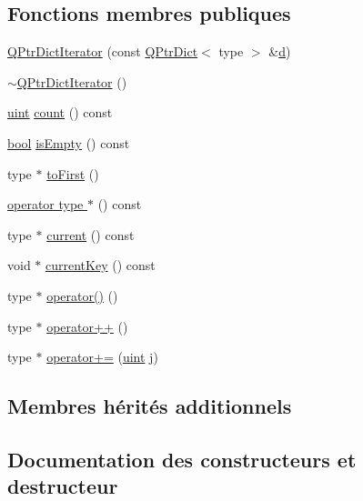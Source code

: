 \subsection*{Fonctions membres publiques}
\begin{DoxyCompactItemize}
\item 
\hyperlink{class_q_ptr_dict_iterator_a6ad02cc60356c93aaff407ed183ffecd}{Q\+Ptr\+Dict\+Iterator} (const \hyperlink{class_q_ptr_dict}{Q\+Ptr\+Dict}$<$ type $>$ \&\hyperlink{060__command__switch_8tcl_af43f4b1f0064a33b2d662af9f06d3a00}{d})
\item 
\hyperlink{class_q_ptr_dict_iterator_ac3a5c8ce21c71a0e4771c3f03197a2df}{$\sim$\+Q\+Ptr\+Dict\+Iterator} ()
\item 
\hyperlink{qglobal_8h_a4d3943ddea65db7163a58e6c7e8df95a}{uint} \hyperlink{class_q_ptr_dict_iterator_a1fb3872926fa5bbb44b3615ef750bb31}{count} () const 
\item 
\hyperlink{qglobal_8h_a1062901a7428fdd9c7f180f5e01ea056}{bool} \hyperlink{class_q_ptr_dict_iterator_a5b4a22ceb76f51ad2230306d24cf98d6}{is\+Empty} () const 
\item 
type $\ast$ \hyperlink{class_q_ptr_dict_iterator_a579251c87c9356f146285e666f6abec6}{to\+First} ()
\item 
\hyperlink{class_q_ptr_dict_iterator_af0c621a40285f997736f2f7f59610360}{operator type $\ast$} () const 
\item 
type $\ast$ \hyperlink{class_q_ptr_dict_iterator_a2dcbcf0d5f4cedb3e327fd4ce8064651}{current} () const 
\item 
void $\ast$ \hyperlink{class_q_ptr_dict_iterator_a5bbfa5859f39bfd7cd6caeaa7ea8bf7c}{current\+Key} () const 
\item 
type $\ast$ \hyperlink{class_q_ptr_dict_iterator_a3cc590bb7d03a60652a02c3b9e3923ee}{operator()} ()
\item 
type $\ast$ \hyperlink{class_q_ptr_dict_iterator_a74d0708ca0b2719f336bdc4aaa635f1a}{operator++} ()
\item 
type $\ast$ \hyperlink{class_q_ptr_dict_iterator_a6f62f34c3702de4d25389a35ca1cf200}{operator+=} (\hyperlink{qglobal_8h_a4d3943ddea65db7163a58e6c7e8df95a}{uint} \hyperlink{060__command__switch_8tcl_a2aaa92757686acea102cba3475f0c13b}{j})
\end{DoxyCompactItemize}
\subsection*{Membres hérités additionnels}


\subsection{Documentation des constructeurs et destructeur}
\hypertarget{class_q_ptr_dict_iterator_a6ad02cc60356c93aaff407ed183ffecd}{}
